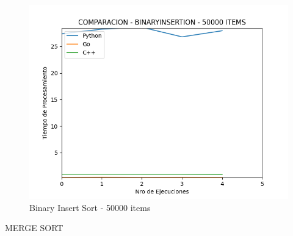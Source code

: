 \documentclass[12pt]{article} %
\begin{document}
    \vspace{5mm}
    
    \begin{figure}[H]
    \centering
    \includegraphics[width=\textwidth]{binaryInsertion_50000}
    \caption{Binary Insert Sort - 50000 items}
    \end{figure}

    \vspace{8cm}

MERGE SORT
\end{document}
